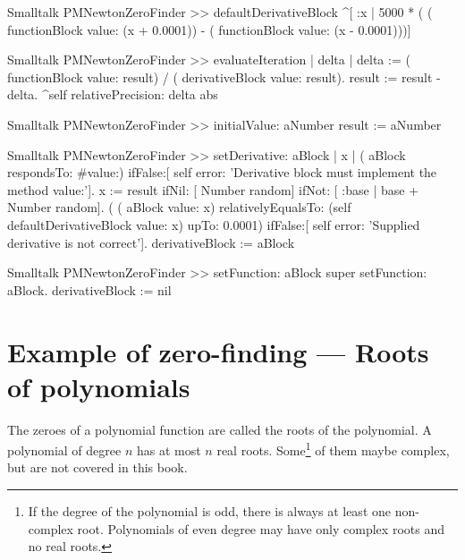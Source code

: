 \begin{displaycode}{Smalltalk}
PMNewtonZeroFinder >> defaultDerivativeBlock
    ^[ :x | 5000 * ( ( functionBlock value: (x + 0.0001)) - ( 
                                  functionBlock value: (x - 0.0001)))]
\end{displaycode}

\begin{displaycode}{Smalltalk}
PMNewtonZeroFinder >> evaluateIteration
    | delta |
    delta := ( functionBlock value: result) / ( derivativeBlock 
                                                       value: result).
    result := result - delta.
    ^self relativePrecision: delta abs
\end{displaycode}

\begin{displaycode}{Smalltalk}
PMNewtonZeroFinder >> initialValue: aNumber
    result := aNumber
\end{displaycode}

\begin{displaycode}{Smalltalk}
PMNewtonZeroFinder >> setDerivative: aBlock
    | x |
    ( aBlock respondsTo: #value:)
        ifFalse:[ self error: 'Derivative block must implement the 
                                                      method value:'].
    x := result ifNil: [ Number random] ifNot: [ :base | base + 
                                                       Number random].
    ( ( aBlock value: x) relativelyEqualsTo: (self 
                        defaultDerivativeBlock value: x) upTo: 0.0001)
        ifFalse:[ self error: 'Supplied derivative is not correct'].
    derivativeBlock := aBlock
\end{displaycode}

\begin{displaycode}{Smalltalk}
PMNewtonZeroFinder >> setFunction: aBlock
    super setFunction: aBlock.
    derivativeBlock := nil
\end{displaycode}


%

\section{Example of zero-finding --- Roots of polynomials}
\label{sec:polroots} The zeroes of a polynomial function are
called the roots of the polynomial. A polynomial of degree $n$ has
at most $n$ real roots. Some\footnote{If the degree of the
polynomial is odd, there is always at least one non-complex root.
Polynomials of even degree may have only complex roots and no real
roots.} of them maybe complex, but are not covered in this book.

